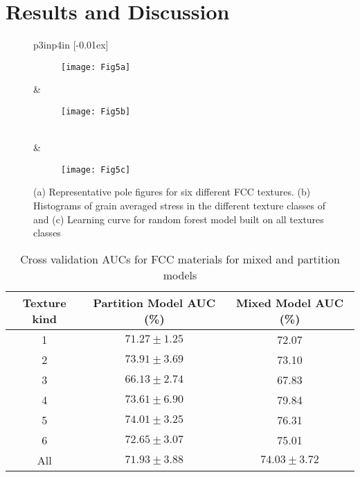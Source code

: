 \documentclass[preprint,1p,times,authoryear]{elsarticle}%
\begin{document}
\section{Results and Discussion }

\begin{figure}[!btp]
  \centering%
  \begin{tabular}{p{3in}p{4in}}
  [-0.01ex\relax]%
  {
  \begin{subfigure}[t]{0.6\textwidth}
		\centering
	    	\texttt{[image: Fig5a]}
	     	 \caption{ }
	    	  \label{fig:FCCtex}
	\end{subfigure}
	} &
	\begin{subfigure}[t]{0.4\textwidth}
	        \centering
		\texttt{[image: Fig5b]}
   		 \caption{ }
    		\label{fig:FccDatasetStress}
    	\end{subfigure}
	\\
  & \begin{subfigure}[t]{0.4\textwidth}
    \texttt{[image: Fig5c]}
        \caption{ }
        \label{FCC learning curve}
    \end{subfigure}
  \end{tabular}
  \caption{(a) Representative pole figures for six different FCC textures. (b) Histograms of grain averaged stress in the different texture classes of and (c) Learning curve for random forest model built on all textures classes}
\end{figure}

\begin{table}[t]
\small
\begin{center}
\caption{Cross validation AUCs for FCC materials for mixed and partition models}
\label{AUC_fcc}
\begin{tabular}{*{3}{c}}
\toprule \textbf{Texture kind} & \textbf{Partition Model AUC (\%)} & \textbf{Mixed Model AUC (\%)} \\ \midrule
1&$71.27\pm1.25$&72.07\\
2&$73.91\pm3.69$&73.10\\
3&$66.13\pm2.74$&67.83\\
4&$73.61\pm6.90$&79.84\\
5&$74.01\pm3.25$&76.31\\
6&$72.65\pm3.07$&75.01\\
\midrule
All&$71.93\pm 3.88$ &$74.03\pm3.72$\\
\bottomrule
\end{tabular}
\end{center}
\end{table}
\end{document}
